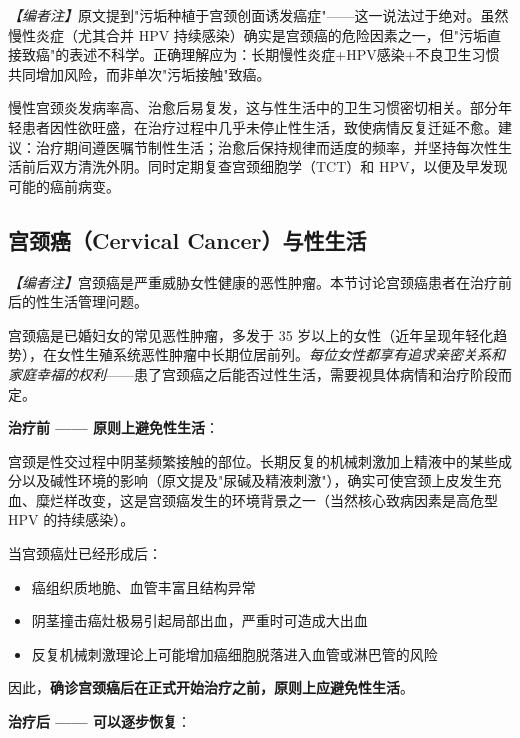 \noindent\textit{【编者注】}原文提到"污垢种植于宫颈创面诱发癌症"——这一说法过于绝对。虽然慢性炎症（尤其合并 HPV 持续感染）确实是宫颈癌的危险因素之一，但"污垢直接致癌"的表述不科学。正确理解应为：长期慢性炎症+HPV感染+不良卫生习惯共同增加风险，而非单次"污垢接触"致癌。

\begin{tcolorbox}[colback=pink!5!white,colframe=red!50!black,title=贴心小叮咛]
慢性宫颈炎发病率高、治愈后易复发，这与性生活中的卫生习惯密切相关。部分年轻患者因性欲旺盛，在治疗过程中几乎未停止性生活，致使病情反复迁延不愈。建议：治疗期间遵医嘱节制性生活；治愈后保持规律而适度的频率，并坚持每次性生活前后双方清洗外阴。同时定期复查宫颈细胞学（TCT）和 HPV，以便及早发现可能的癌前病变。
\end{tcolorbox}

\subsection{宫颈癌（Cervical Cancer）与性生活}

\noindent\textit{【编者注】}宫颈癌是严重威胁女性健康的恶性肿瘤。本节讨论宫颈癌患者在治疗前后的性生活管理问题。

\vspace{0.5em}
宫颈癌是已婚妇女的常见恶性肿瘤，多发于 35 岁以上的女性（近年呈现年轻化趋势），在女性生殖系统恶性肿瘤中长期位居前列。\textit{每位女性都享有追求亲密关系和家庭幸福的权利}——患了宫颈癌之后能否过性生活，需要视具体病情和治疗阶段而定。

\vspace{0.5em}
\noindent\textbf{治疗前 —— 原则上避免性生活}：

宫颈是性交过程中阴茎频繁接触的部位。长期反复的机械刺激加上精液中的某些成分以及碱性环境的影响（原文提及"尿碱及精液刺激"），确实可使宫颈上皮发生充血、糜烂样改变，这是宫颈癌发生的环境背景之一（当然核心致病因素是高危型 HPV 的持续感染）。

当宫颈癌灶已经形成后：
\begin{itemize}
	\item 癌组织质地脆、血管丰富且结构异常
	\item 阴茎撞击癌灶极易引起局部出血，严重时可造成大出血
	\item 反复机械刺激理论上可能增加癌细胞脱落进入血管或淋巴管的风险
\end{itemize}
因此，\textbf{确诊宫颈癌后在正式开始治疗之前，原则上应避免性生活}。

\vspace{0.5em}
\noindent\textbf{治疗后 —— 可以逐步恢复}：

